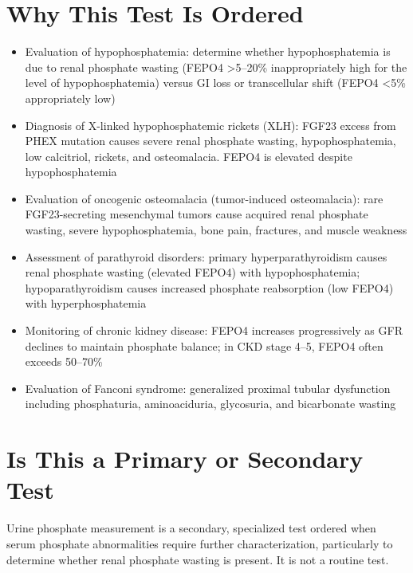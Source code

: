 \section*{Why This Test Is Ordered}
\begin{itemize}
  \item Evaluation of hypophosphatemia: determine whether hypophosphatemia is due to renal phosphate wasting (FEPO4 >5--20\% inappropriately high for the level of hypophosphatemia) versus GI loss or transcellular shift (FEPO4 <5\% appropriately low)
  \item Diagnosis of X-linked hypophosphatemic rickets (XLH): FGF23 excess from PHEX mutation causes severe renal phosphate wasting, hypophosphatemia, low calcitriol, rickets, and osteomalacia. FEPO4 is elevated despite hypophosphatemia
  \item Evaluation of oncogenic osteomalacia (tumor-induced osteomalacia): rare FGF23-secreting mesenchymal tumors cause acquired renal phosphate wasting, severe hypophosphatemia, bone pain, fractures, and muscle weakness
  \item Assessment of parathyroid disorders: primary hyperparathyroidism causes renal phosphate wasting (elevated FEPO4) with hypophosphatemia; hypoparathyroidism causes increased phosphate reabsorption (low FEPO4) with hyperphosphatemia
  \item Monitoring of chronic kidney disease: FEPO4 increases progressively as GFR declines to maintain phosphate balance; in CKD stage 4--5, FEPO4 often exceeds 50--70\%
  \item Evaluation of Fanconi syndrome: generalized proximal tubular dysfunction including phosphaturia, aminoaciduria, glycosuria, and bicarbonate wasting
\end{itemize}

\section*{Is This a Primary or Secondary Test}
Urine phosphate measurement is a secondary, specialized test ordered when serum phosphate abnormalities require further characterization, particularly to determine whether renal phosphate wasting is present. It is not a routine test.

